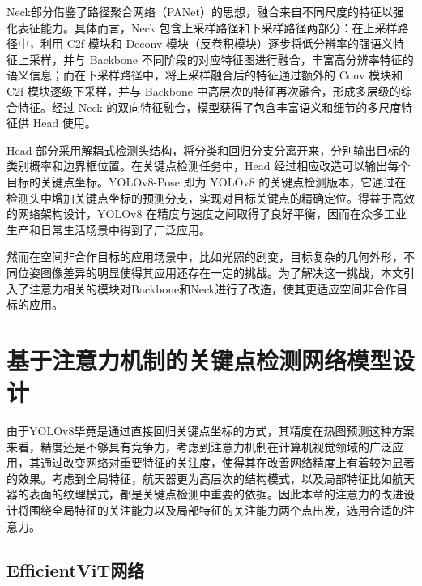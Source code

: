 Neck部分借鉴了路径聚合网络（PANet）的思想，融合来自不同尺度的特征以强化表征能力。具体而言，Neck 包含上采样路径和下采样路径两部分：在上采样路径中，利用 C2f 模块和 Deconv 模块（反卷积模块）逐步将低分辨率的强语义特征上采样，并与 Backbone 不同阶段的对应特征图进行融合，丰富高分辨率特征的语义信息；而在下采样路径中，将上采样融合后的特征通过额外的 Conv 模块和 C2f 模块逐级下采样，并与 Backbone 中高层次的特征再次融合，形成多层级的综合特征。经过 Neck 的双向特征融合，模型获得了包含丰富语义和细节的多尺度特征供 Head 使用。 

Head 部分采用解耦式检测头结构，将分类和回归分支分离开来，分别输出目标的类别概率和边界框位置。在关键点检测任务中，Head 经过相应改造可以输出每个目标的关键点坐标。YOLOv8-Pose 即为 YOLOv8 的关键点检测版本，它通过在检测头中增加关键点坐标的预测分支，实现对目标关键点的精确定位。得益于高效的网络架构设计，YOLOv8 在精度与速度之间取得了良好平衡，因而在众多工业生产和日常生活场景中得到了广泛应用\cite{sohan2024review,s23167190,ani14121791,Dong2024,yuan2024yolov8}。

然而在空间非合作目标的应用场景中，比如光照的剧变，目标复杂的几何外形，不同位姿图像差异的明显使得其应用还存在一定的挑战。为了解决这一挑战，本文引入了注意力相关的模块对Backbone和Neck进行了改造，使其更适应空间非合作目标的应用。


\section{基于注意力机制的关键点检测网络模型设计}
由于YOLOv8毕竟是通过直接回归关键点坐标的方式，其精度在热图预测这种方案来看，精度还是不够具有竞争力，考虑到注意力机制在计算机视觉领域的广泛应用，其通过改变网络对重要特征的关注度，使得其在改善网络精度上有着较为显著的效果。考虑到全局特征，航天器更为高层次的结构模式，以及局部特征比如航天器的表面的纹理模式，都是关键点检测中重要的依据。因此本章的注意力的改进设计将围绕全局特征的关注能力以及局部特征的关注能力两个点出发，选用合适的注意力。
\subsection{EfficientViT网络}

